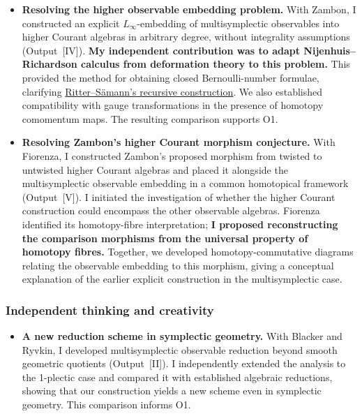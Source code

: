 \documentclass[a4paper,fontsize=11bp]{scrartcl}
\newenvironment{refsection}{\begingroup}{\endgroup}
\begin{document}
\begin{refsection}
\begin{itemize}
\item \textbf{Resolving the higher observable embedding problem.}
With Zambon, I constructed an explicit $L_\infty$-embedding of
multisymplectic observables into higher Courant algebras in arbitrary
degree, without integrality assumptions (Output~[IV]).
\textbf{My independent contribution was to adapt Nijenhuis--Richardson
calculus from deformation theory to this problem.}
This provided the method for obtaining closed Bernoulli-number formulae,
clarifying \href{https://arxiv.org/abs/1507.00972}{Ritter--S\"amann's recursive construction}.
We also established compatibility with gauge transformations in the
presence of homotopy comomentum maps. The resulting comparison supports O1.

\item \textbf{Resolving Zambon's higher Courant morphism conjecture.}
With Fiorenza, I constructed Zambon's proposed morphism from twisted
to untwisted higher Courant algebras and placed it alongside the multisymplectic
observable embedding in a common homotopical framework (Output~[V]). I initiated the investigation of whether
the higher Courant construction could encompass the other observable
algebras. Fiorenza identified its homotopy-fibre interpretation;
\textbf{I proposed reconstructing the comparison morphisms from the
universal property of homotopy fibres.}
Together, we developed homotopy-commutative diagrams relating the
observable embedding to this morphism, giving a conceptual explanation of the
earlier explicit construction in the multisymplectic case.
\end{itemize}

\subsubsection*{Independent thinking and creativity}
\begin{itemize}
\setlength{\itemsep}{0.15\baselineskip}
\setlength{\parsep}{0pt}

\item \textbf{A new reduction scheme in symplectic geometry.}
With Blacker and Ryvkin, I developed multisymplectic observable reduction
beyond smooth geometric quotients (Output~[II]). I independently extended
the analysis to the 1-plectic case and compared it with established
algebraic reductions, showing that our construction yields a new scheme
even in symplectic geometry. This comparison informs O1.


\end{itemize}
\end{refsection}
\end{document}
